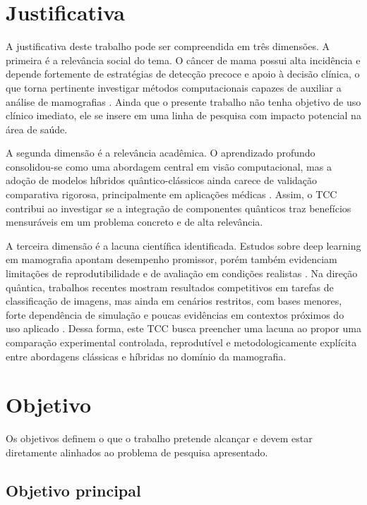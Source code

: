 \documentclass[
    12pt,
    openright,
    oneside,
    a4paper,
    english,
    brazil
]{abntex2}
\begin{document}
\section{Justificativa}
\label{sec:justificativa}

A justificativa deste trabalho pode ser compreendida em três dimensões. A primeira é a relevância social do tema. O câncer de mama possui alta incidência e depende fortemente de estratégias de detecção precoce e apoio à decisão clínica, o que torna pertinente investigar métodos computacionais capazes de auxiliar a análise de mamografias \cite{WHO2025BreastCancer}. Ainda que o presente trabalho não tenha objetivo de uso clínico imediato, ele se insere em uma linha de pesquisa com impacto potencial na área de saúde.

A segunda dimensão é a relevância acadêmica. O aprendizado profundo consolidou-se como uma abordagem central em visão computacional, mas a adoção de modelos híbridos quântico-clássicos ainda carece de validação comparativa rigorosa, principalmente em aplicações médicas \cite{LeCun2015,Gupta2025QMLDigitalHealth}. Assim, o TCC contribui ao investigar se a integração de componentes quânticos traz benefícios mensuráveis em um problema concreto e de alta relevância.

A terceira dimensão é a lacuna científica identificada. Estudos sobre deep learning em mamografia apontam desempenho promissor, porém também evidenciam limitações de reprodutibilidade e de avaliação em condições realistas \cite{Bhalla2023MammographyReview}. Na direção quântica, trabalhos recentes mostram resultados competitivos em tarefas de classificação de imagens, mas ainda em cenários restritos, com bases menores, forte dependência de simulação e poucas evidências em contextos próximos do uso aplicado \cite{Long2025QCQCNN}. Dessa forma, este TCC busca preencher uma lacuna ao propor uma comparação experimental controlada, reprodutível e metodologicamente explícita entre abordagens clássicas e híbridas no domínio da mamografia.

\section{Objetivo}
\label{sec:objetivo}

Os objetivos definem o que o trabalho pretende alcançar e devem estar diretamente alinhados ao problema de pesquisa apresentado.

\subsection{Objetivo principal}
\label{subsec:objetivo_principal}
\end{document}
